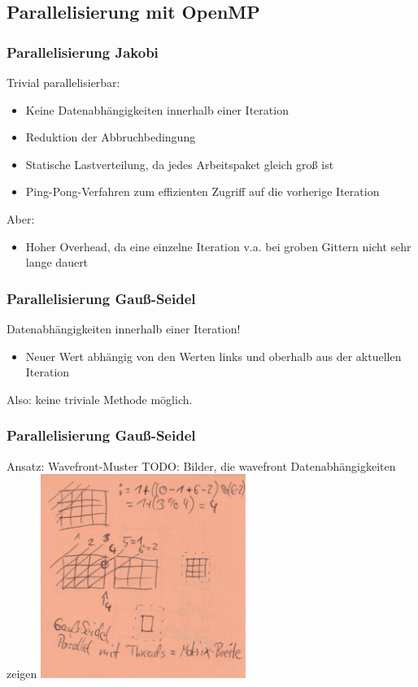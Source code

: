 \documentclass{beamer}
\begin{document}
\subsection{Parallelisierung mit OpenMP}
\begin{frame}
    \frametitle{Parallelisierung Jakobi}
    Trivial parallelisierbar:
    \begin{itemize}
        \item Keine Datenabhängigkeiten innerhalb einer Iteration
        \item Reduktion der Abbruchbedingung
        \item Statische Lastverteilung, da jedes Arbeitspaket gleich groß ist
        \item Ping-Pong-Verfahren zum effizienten Zugriff auf die vorherige Iteration
    \end{itemize}
    Aber:
    \begin{itemize}
        \item Hoher Overhead, da eine einzelne Iteration v.a. bei groben Gittern nicht sehr lange dauert
    \end{itemize}
\end{frame}

\begin{frame}
    \frametitle{Parallelisierung Gauß-Seidel}
    Datenabhängigkeiten innerhalb einer Iteration!
    \begin{itemize}
        \item Neuer Wert abhängig von den Werten links und oberhalb aus der aktuellen Iteration
    \end{itemize}
    Also: keine triviale Methode möglich.
\end{frame}

\begin{frame}
    \frametitle{Parallelisierung Gauß-Seidel}
    Ansatz: Wavefront-Muster
    TODO: Bilder, die wavefront Datenabhängigkeiten zeigen
    \includegraphics[width=0.5\textwidth]{gaussseidelskizze}
\end{frame}
\end{document}
